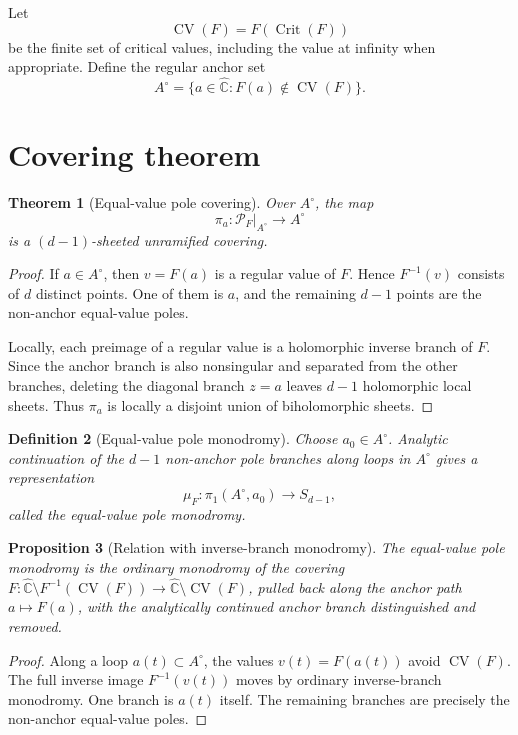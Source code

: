 \documentclass[11pt]{article}
\newtheorem{definition}{Definition}[section]
\newtheorem{theorem}[definition]{Theorem}
\newtheorem{proposition}[definition]{Proposition}
\newcommand{\Chat}{\widehat{\mathbb C}}
\DeclareMathOperator{\Crit}{Crit}
\DeclareMathOperator{\CV}{CV}
\begin{document}
Let
\[
        \CV(F)=F(\Crit(F))
\]
be the finite set of critical values, including the value at infinity when appropriate. Define the regular anchor set
\[
        A^\circ=\{a\in\Chat:F(a)\notin\CV(F)\}.
\]

\section{Covering theorem}

\begin{theorem}[Equal-value pole covering]\label{thm:cover}
Over \(A^\circ\), the map
\[
        \pi_a:\mathcal P_F|_{A^\circ}\to A^\circ
\]
is a \((d-1)\)-sheeted unramified covering.
\end{theorem}

\begin{proof}
If \(a\in A^\circ\), then \(v=F(a)\) is a regular value of \(F\). Hence \(F^{-1}(v)\) consists of \(d\) distinct points. One of them is \(a\), and the remaining \(d-1\) points are the non-anchor equal-value poles.

Locally, each preimage of a regular value is a holomorphic inverse branch of \(F\). Since the anchor branch is also nonsingular and separated from the other branches, deleting the diagonal branch \(z=a\) leaves \(d-1\) holomorphic local sheets. Thus \(\pi_a\) is locally a disjoint union of biholomorphic sheets.
\end{proof}

\begin{definition}[Equal-value pole monodromy]
Choose \(a_0\in A^\circ\). Analytic continuation of the \(d-1\) non-anchor pole branches along loops in \(A^\circ\) gives a representation
\[
        \mu_F:\pi_1(A^\circ,a_0)\to S_{d-1},
\]
called the equal-value pole monodromy.
\end{definition}

\begin{proposition}[Relation with inverse-branch monodromy]\label{prop:ordinary}
The equal-value pole monodromy is the ordinary monodromy of the covering \(F:\Chat\setminus F^{-1}(\CV(F))\to\Chat\setminus\CV(F)\), pulled back along the anchor path \(a\mapsto F(a)\), with the analytically continued anchor branch distinguished and removed.
\end{proposition}

\begin{proof}
Along a loop \(a(t)\subset A^\circ\), the values \(v(t)=F(a(t))\) avoid \(\CV(F)\). The full inverse image \(F^{-1}(v(t))\) moves by ordinary inverse-branch monodromy. One branch is \(a(t)\) itself. The remaining branches are precisely the non-anchor equal-value poles.
\end{proof}
\end{document}
